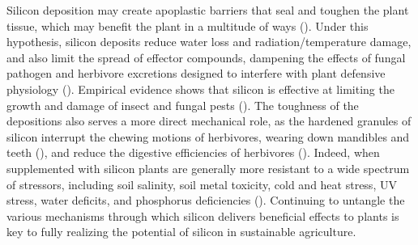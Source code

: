 \documentclass[12pt, letterpaper, ]{report}
\begin{document}
Silicon deposition may create apoplastic barriers that seal and toughen the plant tissue, which may benefit the plant in a multitude of ways (\cite{coskun_controversies_2019}). Under this hypothesis, silicon deposits reduce water loss and radiation/temperature damage, and also limit the spread of effector compounds, dampening the effects of fungal pathogen and herbivore excretions designed to interfere with plant defensive physiology (\cite{coskun_controversies_2019}). Empirical evidence shows that silicon is effective at limiting the growth and damage of insect and fungal pests (\cite{fauteux_silicon_2005,massey_herbivore_2007}). The toughness of the depositions also serves a more direct mechanical role, as the hardened granules of silicon interrupt the chewing motions of herbivores, wearing down mandibles and teeth (\cite{stromberg_functions_2016,waterman_short-term_2021-1}), and reduce the digestive efficiencies of herbivores (\cite{johnson_silicon_2021}). Indeed, when supplemented with silicon plants are generally more resistant to a wide spectrum of stressors, including soil salinity, soil metal toxicity, cold and heat stress, UV stress, water deficits, and phosphorus deficiencies (\cite{cooke_consistent_2016}). Continuing to untangle the various mechanisms through which silicon delivers beneficial effects to plants is key to fully realizing the potential of silicon in sustainable agriculture.
\end{document}
